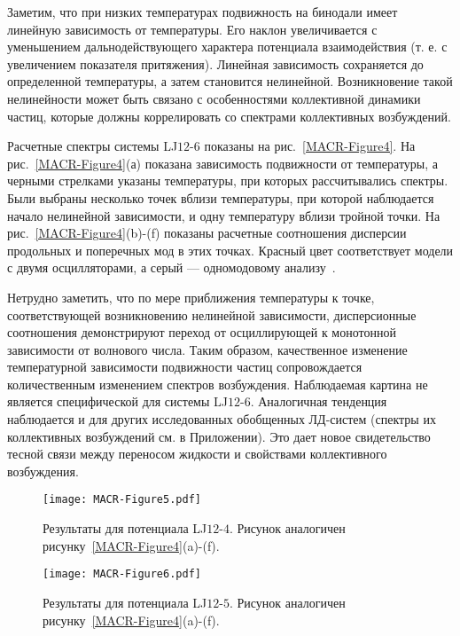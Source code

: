 Заметим, что при низких температурах подвижность на бинодали имеет линейную зависимость от температуры. Его наклон увеличивается с уменьшением дальнодействующего характера потенциала взаимодействия (т. е. с увеличением показателя притяжения). Линейная зависимость сохраняется до определенной температуры, а затем становится нелинейной. Возникновение такой нелинейности может быть связано с особенностями коллективной динамики частиц, которые должны коррелировать со спектрами коллективных возбуждений.

Расчетные спектры системы LJ$12$-$6$ показаны на рис.~\ref{MACR-Figure4}. На рис.~\ref{MACR-Figure4}(а) показана зависимость подвижности от температуры, а черными стрелками указаны температуры, при которых рассчитывались спектры. Были выбраны несколько точек вблизи температуры, при которой наблюдается начало нелинейной зависимости, и одну температуру вблизи тройной точки. На рис.~\ref{MACR-Figure4}(b)-(f) показаны расчетные соотношения дисперсии продольных и поперечных мод в этих точках. Красный цвет соответствует модели с двумя осцилляторами, а серый — одномодовому анализу~\cite{10.1038/s41598-019-46979-y}.

Нетрудно заметить, что по мере приближения температуры к точке, соответствующей возникновению нелинейной зависимости, дисперсионные соотношения демонстрируют переход от осциллирующей к монотонной зависимости от волнового числа. Таким образом, качественное изменение температурной зависимости подвижности частиц сопровождается количественным изменением спектров возбуждения. Наблюдаемая картина не является специфической для системы LJ$12$-$6$. Аналогичная тенденция наблюдается и для других исследованных обобщенных ЛД-систем (спектры их коллективных возбуждений см. в Приложении). Это дает новое свидетельство тесной связи между переносом жидкости и свойствами коллективного возбуждения.

\begin{figure}
\centering
 \texttt{[image: MACR-Figure5.pdf]}
 \caption{Результаты для потенциала LJ$12$-$4$. Рисунок аналогичен рисунку~\ref{MACR-Figure4}(a)-(f).}
\label{MACR-Figure5}
\end{figure}


\begin{figure}
\centering
 \texttt{[image: MACR-Figure6.pdf]}
 \caption{Результаты для потенциала LJ$12$-$5$. Рисунок аналогичен рисунку~\ref{MACR-Figure4}(a)-(f).}
\label{MACR-Figure6}
\end{figure}



